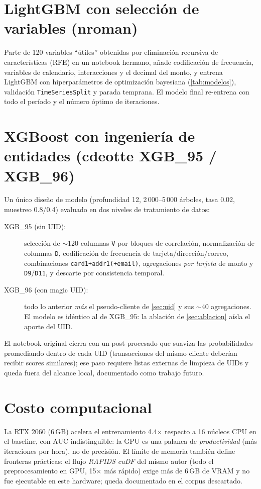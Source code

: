 \section{LightGBM con selección de variables (nroman)}

Parte de 120 variables ``útiles'' obtenidas por eliminación recursiva de características (RFE)
en un notebook hermano, añade codificación de frecuencia, variables de calendario,
interacciones y el decimal del monto, y entrena LightGBM con hiperparámetros de optimización
bayesiana (\cref{tab:modelos}), validación \texttt{TimeSeriesSplit} y parada temprana. El modelo
final re-entrena con todo el período y el número óptimo de iteraciones.

\section{XGBoost con ingeniería de entidades (cdeotte XGB\_95 / XGB\_96)}

Un único diseño de modelo (profundidad 12, 2\,000--5\,000 árboles, tasa 0.02, muestreo
0.8/0.4) evaluado en dos niveles de tratamiento de datos:

\begin{description}
  \item[XGB\_95 (sin UID):] selección de $\sim$120 columnas \texttt{V} por bloques de
        correlación, normalización de columnas \texttt{D}, codificación de frecuencia de
        tarjeta/dirección/correo, combinaciones \texttt{card1+addr1(+email)}, agregaciones
        \emph{por tarjeta} de monto y \texttt{D9}/\texttt{D11}, y descarte por consistencia
        temporal.
  \item[XGB\_96 (con magic UID):] todo lo anterior \emph{más} el pseudo-cliente de
        \cref{sec:uid} y sus $\sim$40 agregaciones. El modelo es idéntico al de XGB\_95:
        la ablación de \cref{sec:ablacion} aísla el aporte del UID.
\end{description}

El notebook original cierra con un post-procesado que suaviza las probabilidades promediando
dentro de cada UID (transacciones del mismo cliente deberían recibir scores similares); ese
paso requiere listas externas de limpieza de UIDs y queda fuera del alcance local, documentado
como trabajo futuro.

\section{Costo computacional}

La RTX 2060 (6\,GB) acelera el entrenamiento 4.4$\times$ respecto a 16 núcleos CPU en el
baseline, con AUC indistinguible: la GPU es una palanca de \emph{productividad} (más
iteraciones por hora), no de precisión. El límite de memoria también define fronteras
prácticas: el flujo \emph{RAPIDS cuDF} del mismo autor (todo el preprocesamiento en GPU,
15$\times$ más rápido) exige más de 6\,GB de VRAM y no fue ejecutable en este hardware;
queda documentado en el corpus descartado.
